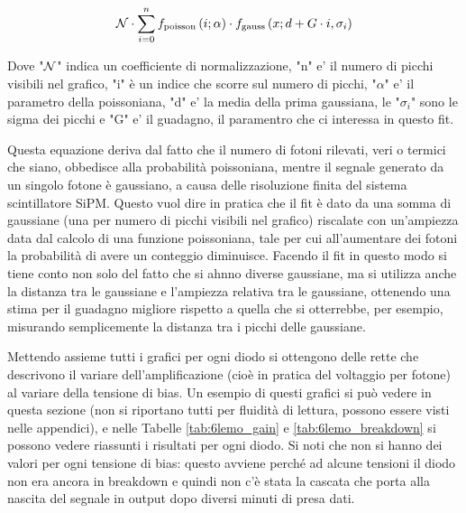 \begin{equation}
	{\cal N}\cdot\sum_{i=0}^{n}f_{\mathrm{poisson}}\left(i;\alpha\right)\cdot f_{\mathrm{gauss}}\left(x; d + G\cdot i, \sigma_i\right)
	\label{eq:segnale_buio}
\end{equation}

Dove "${\cal N}$" indica un coefficiente di normalizzazione, "n" e' il numero di picchi visibili nel grafico, "i" \`e un indice che scorre sul numero di picchi, "$\alpha$" e' il parametro della poissoniana, "d" e' la media della prima gaussiana, le "$\sigma_i$" sono le sigma dei picchi e "G" e' il guadagno, il paramentro che ci interessa in questo fit.

Questa equazione deriva dal fatto che il numero di fotoni rilevati, veri o termici che siano, obbedisce alla probabilit\`a poissoniana, mentre il segnale generato da un singolo fotone \`e gaussiano, a causa delle risoluzione finita del sistema scintillatore SiPM. Questo vuol dire in pratica che il fit è dato da una somma di gaussiane (una per numero di picchi visibili nel grafico) riscalate con un'ampiezza data dal calcolo di una funzione poissoniana, tale per cui all'aumentare dei fotoni la probabilità di avere un conteggio
diminuisce. Facendo il fit in questo modo si tiene conto non solo del fatto che si ahnno diverse gaussiane, ma si utilizza anche la distanza tra le gaussiane e  l'ampiezza
relativa tra le gaussiane, ottenendo una stima per il guadagno migliore rispetto a quella che si otterrebbe, per esempio, misurando semplicemente la distanza tra i picchi delle gaussiane.

Mettendo assieme tutti i grafici per ogni diodo si ottengono delle rette che descrivono il variare dell'amplificazione (cioè in pratica del voltaggio per fotone) al variare
della tensione di bias. Un esempio di questi grafici si può vedere in questa sezione (non si riportano tutti per fluidità di lettura, possono essere visti nelle appendici), e nelle Tabelle \ref{tab:6lemo_gain} e \ref{tab:6lemo_breakdown} si possono vedere riassunti i risultati per ogni diodo. Si noti che non si hanno dei valori per ogni tensione
di bias: questo avviene perché ad alcune tensioni il diodo non era ancora in breakdown e quindi non c'è stata la cascata che porta alla nascita del segnale in output dopo diversi minuti di presa dati.

